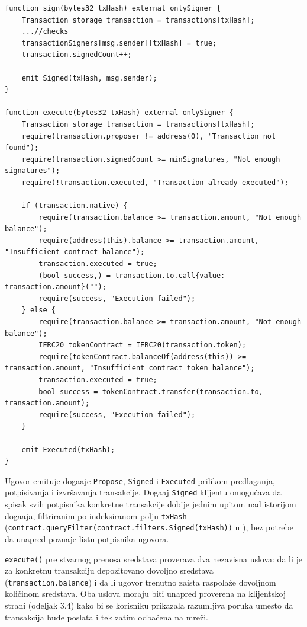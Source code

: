 \begin{lstlisting}[caption={Potpisivanje i izvr\v savanje transakcije}, label={lst:multisig-sign-execute}]
function sign(bytes32 txHash) external onlySigner {
    Transaction storage transaction = transactions[txHash];
    ...//checks
    transactionSigners[msg.sender][txHash] = true;
    transaction.signedCount++;

    emit Signed(txHash, msg.sender);
}

function execute(bytes32 txHash) external onlySigner {
    Transaction storage transaction = transactions[txHash];
    require(transaction.proposer != address(0), "Transaction not found");
    require(transaction.signedCount >= minSignatures, "Not enough signatures");
    require(!transaction.executed, "Transaction already executed");

    if (transaction.native) {
        require(transaction.balance >= transaction.amount, "Not enough balance");
        require(address(this).balance >= transaction.amount, "Insufficient contract balance");
        transaction.executed = true;
        (bool success,) = transaction.to.call{value: transaction.amount}("");
        require(success, "Execution failed");
    } else {
        require(transaction.balance >= transaction.amount, "Not enough balance");
        IERC20 tokenContract = IERC20(transaction.token);
        require(tokenContract.balanceOf(address(this)) >= transaction.amount, "Insufficient contract token balance");
        transaction.executed = true;
        bool success = tokenContract.transfer(transaction.to, transaction.amount);
        require(success, "Execution failed");
    }

    emit Executed(txHash);
}
\end{lstlisting}

Ugovor emituje doga\dj aje \texttt{Propose}, \texttt{Signed} i \texttt{Executed} prilikom predlaganja, potpisivanja i izvr\v savanja transakcije. Doga\dj aj \texttt{Signed} klijentu omogu\' cava da spisak svih potpisnika konkretne transakcije dobije jednim upitom nad istorijom doga\dj aja, filtriranim po indeksiranom polju \texttt{txHash} (\texttt{contract.queryFilter(contract.filters.Signed(txHash))} u ), bez potrebe da unapred poznaje listu potpisnika ugovora.

\texttt{execute()} pre stvarnog prenosa sredstava proverava dva nezavisna uslova: da li je za konkretnu transakciju depozitovano dovoljno sredstava (\texttt{transaction.balance}) i da li ugovor trenutno zaista raspola\v ze dovoljnom koli\v cinom sredstava. Oba uslova moraju biti unapred proverena na klijentskoj strani (odeljak 3.4) kako bi se korisniku prikazala razumljiva poruka umesto da transakcija bude poslata i tek zatim odba\v cena na mre\v zi.

